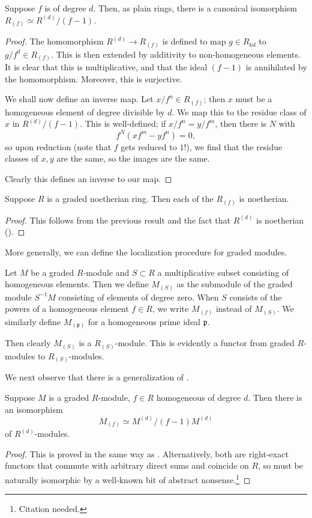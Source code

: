 \begin{proposition} \label{loc interpret as quotient ring}
Suppose $f$ is of degree $d$. Then, as plain rings,  there is a
canonical isomorphism $R_{(f)} \simeq R^{(d)}/(f-1)$.
\end{proposition} 
\begin{proof} 
The homomorphism $R^{(d)} \to R_{(f)}$ is defined to map $g \in R_{kd}$ to
$g/f^d \in
R_{(f)}$.  This is then extended by additivity to non-homogeneous elements. It
is clear that this is multiplicative, and that the ideal $(f-1)$ is annihilated
by the homomorphism.
Moreover, this is surjective.

We shall now define an inverse map. Let $x/f^n \in R_{(f)}$; then $x$ must be
a homogeneous element of degree divisible by $d$. We map this to
the residue class of $x$ in $R^{(d)}/(f-1)$.  This is well-defined; if $x/f^n =
y/f^m$, then there is $N$ with
\[ f^N( xf^m - yf^n) = 0,  \]
so upon reduction (note that $f$ gets reduced to $1$!), we find that the
residue classes of $x,y$ are the same, so the images are the same.

Clearly this defines an inverse to our map.
\end{proof} 

\begin{corollary} 
Suppose $R$ is a graded noetherian ring. Then each of the $R_{(f)}$ is
noetherian.
\end{corollary} 
\begin{proof} 
This follows from the previous result and the fact that $R^{(d)}$ is noetherian
().\end{proof} 

More generally, we can define the localization procedure for graded modules.
\begin{definition} 
Let $M$ be a graded $R$-module and $S \subset R$ a multiplicative subset
consisting of homogeneous elements. Then we define $M_{(S)}$ as the submodule
of the graded module $S^{-1}M$ consisting of elements of degree zero. When $S$
consists of the powers of a homogeneous element $f \in R$, we write $M_{(f)}$
instead of $M_{(S)}$. We similarly define $M_{(\mathfrak{p})}$ for a
homogeneous prime ideal $\mathfrak{p}$.
\end{definition} 

Then clearly $M_{(S)}$ is a $R_{(S)}$-module. This is evidently a functor from
graded $R$-modules to $R_{(S)}$-modules.

We next observe that there is a generalization of .
\begin{proposition} \label{loc
module as quotient}
Suppose $M$ is a graded $R$-module, $f \in R$ homogeneous of degree $d$. Then
there is  an isomorphism
\[ M_{(f)} \simeq M^{(d)}/(f-1)M^{(d)}  \]
of $R^{(d)}$-modules.
\end{proposition}
\begin{proof} 
This is proved in the same way as . Alternatively, both are right-exact functors that commute with
arbitrary direct sums and coincide on $R$, so must be naturally isomorphic by
a well-known bit of abstract nonsense.\footnote{Citation needed.} 
\end{proof} 

